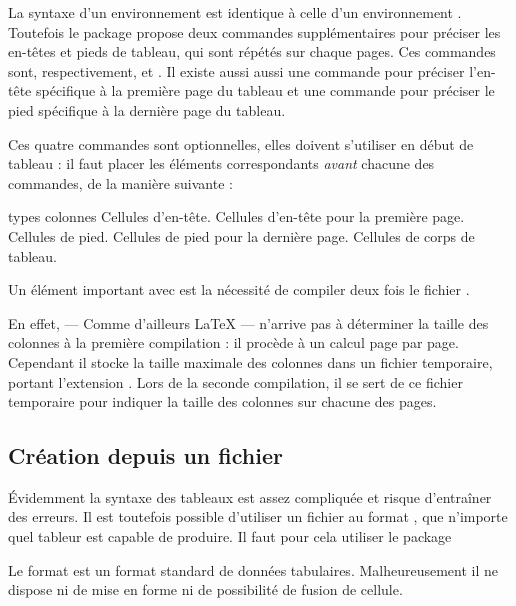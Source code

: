 La syntaxe d'un environnement  est identique à celle d'un environnement . Toutefois le package propose deux  commandes supplémentaires pour préciser les en-têtes et pieds de tableau, qui sont répétés sur chaque pages. Ces commandes sont, respectivement,  et . Il existe aussi aussi une commande  pour préciser l'en-tête  spécifique à la première page du tableau et une commande  pour préciser le pied  spécifique à la dernière page du tableau.

Ces quatre commandes sont optionnelles, elles  doivent s'utiliser en début de tableau : il faut placer les éléments correspondants \emph{avant} chacune des commandes, de la manière suivante :

\begin{latexcode}
\begin{longtable}{types colonnes}
Cellules d'en-tête.
\endhead
Cellules d'en-tête pour la première page.
\endfirsthead
Cellules de pied.
\endfoot
Cellules de pied pour la dernière page.
\endlastfoot
Cellules de corps de tableau.
\end{longtable}
\end{latexcode}

\begin{attention}
Un élément important avec  est la nécessité de compiler deux fois le fichier . 

En effet, \XeLaTeX{} --- Comme d'ailleurs \LaTeX{} --- n'arrive pas à déterminer la taille des colonnes à la première compilation : il procède à un calcul page par page. Cependant il stocke la taille maximale des colonnes dans un fichier temporaire, portant l'extension . Lors de la seconde compilation, il se sert de ce fichier temporaire pour indiquer la taille des colonnes sur chacune des pages.
\end{attention}
\subsection{Création depuis un fichier }

Évidemment la syntaxe des tableaux est assez compliquée et risque d'entraîner des erreurs. Il est toutefois possible d'utiliser un fichier au format , que n'importe quel tableur est capable de produire. Il faut pour cela utiliser le package 

Le format  est un format standard de données tabulaires. Malheureusement il ne dispose ni de mise en forme ni de possibilité de fusion de cellule.

